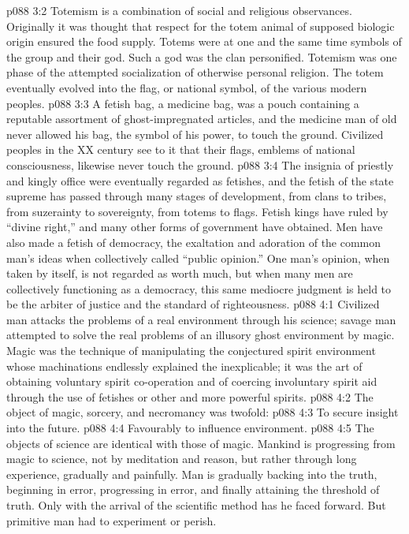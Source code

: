 \vs p088 3:2 Totemism is a combination of social and religious observances. Originally it was thought that respect for the totem animal of supposed biologic origin ensured the food supply. Totems were at one and the same time symbols of the group and their god. Such a god was the clan personified. Totemism was one phase of the attempted socialization of otherwise personal religion. The totem eventually evolved into the flag, or national symbol, of the various modern peoples.
\vs p088 3:3 A fetish bag, a medicine bag, was a pouch containing a reputable assortment of ghost\hyp{}impregnated articles, and the medicine man of old never allowed his bag, the symbol of his power, to touch the ground. Civilized peoples in the XX century see to it that their flags, emblems of national consciousness, likewise never touch the ground.
\vs p088 3:4 The insignia of priestly and kingly office were eventually regarded as fetishes, and the fetish of the state supreme has passed through many stages of development, from clans to tribes, from suzerainty to sovereignty, from totems to flags. Fetish kings have ruled by “divine right,” and many other forms of government have obtained. Men have also made a fetish of democracy, the exaltation and adoration of the common man’s ideas when collectively called “public opinion.” One man’s opinion, when taken by itself, is not regarded as worth much, but when many men are collectively functioning as a democracy, this same mediocre judgment is held to be the arbiter of justice and the standard of righteousness.
\vs p088 4:1 Civilized man attacks the problems of a real environment through his science; savage man attempted to solve the real problems of an illusory ghost environment by magic. Magic was the technique of manipulating the conjectured spirit environment whose machinations endlessly explained the inexplicable; it was the art of obtaining voluntary spirit co\hyp{}operation and of coercing involuntary spirit aid through the use of fetishes or other and more powerful spirits.
\vs p088 4:2 The object of magic, sorcery, and necromancy was twofold:
\vs p088 4:3 \bibnobreakspace To secure insight into the future.
\vs p088 4:4 \bibnobreakspace Favourably to influence environment.
\vs p088 4:5 \pc The objects of science are identical with those of magic. Mankind is progressing from magic to science, not by meditation and reason, but rather through long experience, gradually and painfully. Man is gradually backing into the truth, beginning in error, progressing in error, and finally attaining the threshold of truth. Only with the arrival of the scientific method has he faced forward. But primitive man had to experiment or perish.
